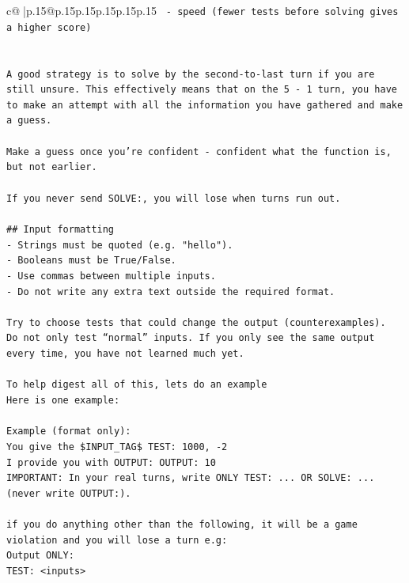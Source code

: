 \documentclass{article}
\begin{document}
{\begin{supertabular}{c@{$\;$}|p{.15\linewidth}@{}p{.15\linewidth}p{.15\linewidth}p{.15\linewidth}p{.15\linewidth}p{.15\linewidth}}
{{{\texttt{		{-} speed (fewer tests before solving gives a higher score)} \\
\\ 
\\ 
\texttt{A good strategy is to solve by the second{-}to{-}last turn if you are still unsure. This effectively means that on the 5 {-} 1 turn, you have to make an attempt with all the information you have gathered and make a guess.} \\
\\ 
\texttt{Make a guess once you're confident {-} confident what the function is, but not earlier.} \\
\\ 
\texttt{If you never send SOLVE:, you will lose when turns run out.} \\
\\ 
\texttt{\#\# Input formatting} \\
\texttt{{-} Strings must be quoted (e.g. "hello").} \\
\texttt{{-} Booleans must be True/False.} \\
\texttt{{-} Use commas between multiple inputs.} \\
\texttt{{-} Do not write any extra text outside the required format.} \\
\\ 
\texttt{Try to choose tests that could change the output (counterexamples).} \\
\texttt{Do not only test “normal” inputs. If you only see the same output every time, you have not learned much yet.} \\
\\ 
\texttt{To help digest all of this, lets do an example} \\
\texttt{Here is one example:} \\
\\ 
\texttt{Example (format only):} \\
\texttt{You give the \$INPUT\_TAG\$ TEST: 1000, {-}2} \\
\texttt{I provide you with OUTPUT: OUTPUT: 10} \\
\texttt{IMPORTANT: In your real turns, write ONLY TEST: ... OR SOLVE: ... (never write OUTPUT:).} \\
\\ 
\texttt{if you do anything other than the following, it will be a game violation and you will lose a turn e.g:} \\
\texttt{Output ONLY:} \\
\texttt{TEST: <inputs>} \\
}}}
\end{supertabular}}
\end{document}
